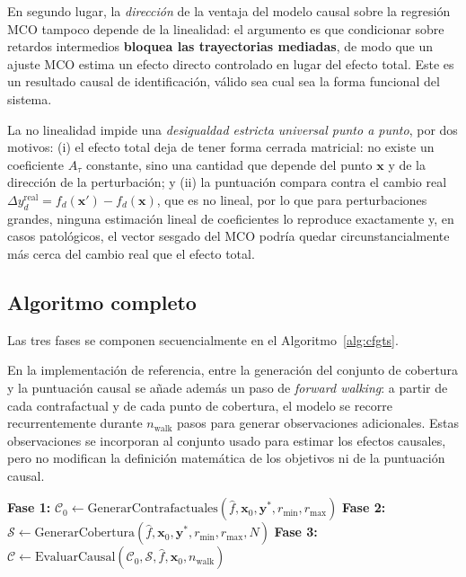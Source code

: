 \documentclass[12pt]{report} %
\begin{document}
En segundo lugar, la \emph{dirección} de la ventaja del modelo causal sobre la regresión MCO tampoco depende de la linealidad: el argumento es que condicionar sobre retardos intermedios \textbf{bloquea las trayectorias mediadas}, de modo que un ajuste MCO estima un efecto directo controlado en lugar del efecto total. Este es un resultado causal de identificación, válido sea cual sea la forma funcional del sistema.

La no linealidad impide una \emph{desigualdad estricta universal punto a punto}, por dos motivos: (i) el efecto total deja de tener forma cerrada matricial: no existe un coeficiente $A_\tau$ constante, sino una cantidad que depende del punto $\mathbf{x}$ y de la dirección de la perturbación; y (ii) la puntuación compara contra el cambio real $\Delta y_d^{\text{real}} = f_d(\mathbf{x}') - f_d(\mathbf{x})$, que es no lineal, por lo que para perturbaciones grandes, ninguna estimación lineal de coeficientes lo reproduce exactamente y, en casos patológicos, el vector sesgado del MCO podría quedar circunstancialmente más cerca del cambio real que el efecto total.

\subsection{Algoritmo completo}

Las tres fases se componen secuencialmente en el Algoritmo~\ref{alg:cfgts}.

En la implementación de referencia, entre la generación del conjunto de cobertura y la puntuación causal se añade además un paso de \textit{forward walking}: a partir de cada contrafactual y de cada punto de cobertura, el modelo se recorre recurrentemente durante $n_{\text{walk}}$ pasos para generar observaciones adicionales. Estas observaciones se incorporan al conjunto usado para estimar los efectos causales, pero no modifican la definición matemática de los objetivos ni de la puntuación causal.

\begin{algorithm}[H]
    \caption{CFGTS: Generación de explicaciones contrafactuales para series temporales}
    \label{alg:cfgts}
    \textbf{Fase 1:} $\mathcal{C}_0 \leftarrow \text{GenerarContrafactuales}(\hat{f}, \mathbf{x}_0, \mathbf{y}^{*}, r_{\min}, r_{\max})$ 
    \textbf{Fase 2:} $\mathcal{S} \leftarrow \text{GenerarCobertura}(\hat{f}, \mathbf{x}_0, \mathbf{y}^{*}, r_{\min}, r_{\max}, N)$ 
    \textbf{Fase 3:} $\mathcal{C} \leftarrow \text{EvaluarCausal}(\mathcal{C}_0, \mathcal{S}, \hat{f}, \mathbf{x}_0, n_{\text{walk}})$ 
\end{algorithm}
\end{document}
